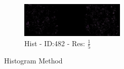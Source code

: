 \documentclass[letterpaper,10pt,oneside]{article}
\begin{document}
\begin{figure}[hbtp]
\begin{subfigure}[b]{5cm}
    \includegraphics[width=5cm]{visualization/results/histogramSeg/res_reduce_5/Region_1_PO14-00482B3_1_2_201404171123.png}
    \caption{Hist - ID:482 - Res: $\frac{1}{5}$}
  \end{subfigure}
  \caption{Histogram Method}
\end{figure}
\end{document}
